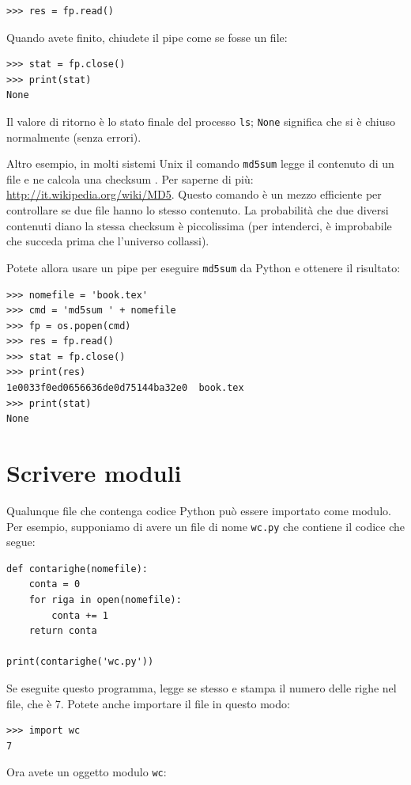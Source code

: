 \documentclass[10pt]{book}
\begin{document}
\begin{verbatim}
>>> res = fp.read()
\end{verbatim}
%
Quando avete finito, chiudete il pipe come se fosse un file:

\begin{verbatim}
>>> stat = fp.close()
>>> print(stat)
None
\end{verbatim}
%
Il valore di ritorno è lo stato finale del processo {\tt ls};
{\tt None} significa che si è chiuso normalmente (senza errori).

Altro esempio, in molti sistemi Unix il comando {\tt md5sum}
legge il contenuto di un file e ne calcola una checksum . Per saperne di più: \url{http://it.wikipedia.org/wiki/MD5}.  Questo comando è un mezzo efficiente per controllare se due file hanno lo stesso contenuto. La probabilità che due diversi contenuti diano la stessa checksum è piccolissima (per intenderci, è improbabile che succeda prima che l'universo collassi).

Potete allora usare un pipe per eseguire {\tt md5sum} da Python e ottenere il risultato:

\begin{verbatim}
>>> nomefile = 'book.tex'
>>> cmd = 'md5sum ' + nomefile
>>> fp = os.popen(cmd)
>>> res = fp.read()
>>> stat = fp.close()
>>> print(res)
1e0033f0ed0656636de0d75144ba32e0  book.tex
>>> print(stat)
None
\end{verbatim}


\section{Scrivere moduli}
\label{modules}

Qualunque file che contenga codice Python può essere importato come modulo. Per esempio, supponiamo di avere un file di nome {\tt wc.py} che contiene il codice che segue:

\begin{verbatim}
def contarighe(nomefile):
    conta = 0
    for riga in open(nomefile):
        conta += 1
    return conta

print(contarighe('wc.py'))
\end{verbatim}
%
Se eseguite questo programma, legge se stesso e stampa il numero delle righe nel file, che è 7. Potete anche importare il file in questo modo:

\begin{verbatim}
>>> import wc
7
\end{verbatim}
%
Ora avete un oggetto modulo {\tt wc}:
\end{document}

